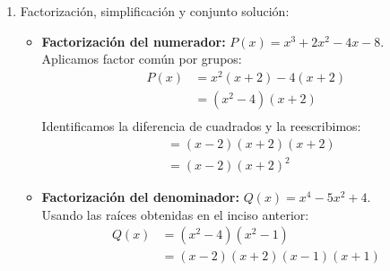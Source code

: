 \documentclass[11pt]{article}
\begin{document}
\begin{enumerate}
\begin{enumerate}
        Factorizamos el trinomio trabajando con las raices de la ecuación cuadrática
        \begin{align*}
            u_{1,2}&= \frac{-b \pm \sqrt{b^2-4ac}}{2a} = \frac{5 \pm \sqrt{(-5)^2-4\cdot 1 \cdot 4}}{2\cdot 1}\\
            &=\frac{5 \pm \sqrt{25-16}}{2}\\
            &=\frac{5 \pm \sqrt{9}}{2}\\
            &=\frac{5 \pm 3}{2}\\
            &\implies u_1=\frac{5 + 3}{2}= \frac{8}{2}=4, u_2=\frac{5 - 3}{2}=\frac{2}{2}=1
        \end{align*}
        Es decir, $u^2 - 5u + 4$ es equivalente a $(u - 4)(u - 1)$, así es fácil ver los valores de $u$ que me provocan 0 en el denominador. Volviendo a la variable original $x$:
        \begin{itemize}
            \item Si $x^2 = 4 \implies x = 2 \quad \text{o} \quad x = -2$
            \item Si $x^2 = 1 \implies x = 1 \quad \text{o} \quad x = -1$
        \end{itemize}
        La ecuación \textbf{no está definida} para $x \in \{-2, -1, 1, 2\}$, ya que para estos valores el denominador se anula provocando una indeterminación.
        \item Factorización, simplificación y conjunto solución:
            \begin{itemize}
                \item \textbf{Factorización del numerador:} $P(x) = x^3 + 2x^2 - 4x - 8$. \\
                    Aplicamos factor común por grupos:
                    \begin{align*}
                        P(x) &= x^2(x + 2) - 4(x + 2) \\
                        &= (x^2 - 4)(x + 2) \\
                    \end{align*}
                    Identificamos la diferencia de cuadrados y la reescribimos:
                    \begin{align*}
                        &= (x - 2)(x + 2)(x + 2) \\
                        &= (x - 2)(x + 2)^2
                    \end{align*}

                \item \textbf{Factorización del denominador:} $Q(x) = x^4 - 5x^2 + 4$. \\
                    Usando las raíces obtenidas en el inciso anterior:
                    \begin{align*}
                        Q(x) &= (x^2 - 4)(x^2 - 1) \\
                        &= (x - 2)(x + 2)(x - 1)(x + 1)
                    \end{align*}
            \end{itemize}


\end{enumerate}
\end{enumerate}
\end{document}
